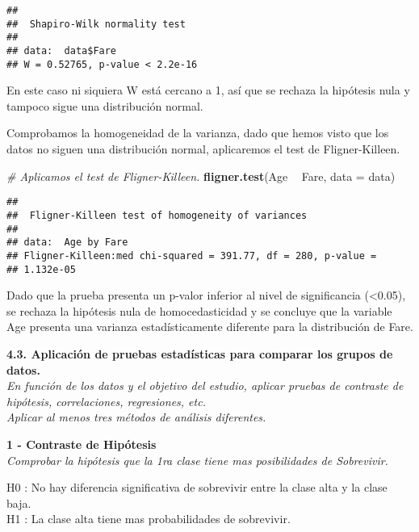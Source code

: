 \documentclass[]{article}
\newenvironment{Shaded}{\begin{snugshade}}{\end{snugshade}}
\newcommand{\KeywordTok}[1]{\textcolor[rgb]{0.13,0.29,0.53}{\textbf{#1}}}
\newcommand{\DataTypeTok}[1]{\textcolor[rgb]{0.13,0.29,0.53}{#1}}
\newcommand{\StringTok}[1]{\textcolor[rgb]{0.31,0.60,0.02}{#1}}
\newcommand{\CommentTok}[1]{\textcolor[rgb]{0.56,0.35,0.01}{\textit{#1}}}
\newcommand{\OperatorTok}[1]{\textcolor[rgb]{0.81,0.36,0.00}{\textbf{#1}}}
\newcommand{\NormalTok}[1]{#1}
\begin{document}
\begin{verbatim}
## 
##  Shapiro-Wilk normality test
## 
## data:  data$Fare
## W = 0.52765, p-value < 2.2e-16
\end{verbatim}

En este caso ni siquiera W está cercano a 1, así que se rechaza la
hipótesis nula y tampoco sigue una distribución normal.

Comprobamos la homogeneidad de la varianza, dado que hemos visto que los
datos no siguen una distribución normal, aplicaremos el test de
Fligner-Killeen.

\begin{Shaded}
\begin{Highlighting}[]
\CommentTok{# Aplicamos el test de Fligner-Killeen.}
\KeywordTok{fligner.test}\NormalTok{(Age }\OperatorTok{~}\StringTok{ }\NormalTok{Fare, }\DataTypeTok{data =}\NormalTok{ data)}
\end{Highlighting}
\end{Shaded}

\begin{verbatim}
## 
##  Fligner-Killeen test of homogeneity of variances
## 
## data:  Age by Fare
## Fligner-Killeen:med chi-squared = 391.77, df = 280, p-value =
## 1.132e-05
\end{verbatim}

Dado que la prueba presenta un p-valor inferior al nivel de
significancia (\textless{}0.05), se rechaza la hipótesis nula de
homocedasticidad y se concluye que la variable Age presenta una varianza
estadísticamente diferente para la distribución de Fare.

\textbf{4.3. Aplicación de pruebas estadísticas para comparar los grupos
de datos.}\\
\emph{En función de los datos y el objetivo del estudio, aplicar pruebas
de contraste de hipótesis, correlaciones, regresiones, etc.}\\
\emph{Aplicar al menos tres métodos de análisis diferentes.}

\textbf{1 - Contraste de Hipótesis}\\
\emph{Comprobar la hipótesis que la 1ra clase tiene mas posibilidades de
Sobrevivir.}

H0 : No hay diferencia significativa de sobrevivir entre la clase alta y
la clase baja.\\
H1 : La clase alta tiene mas probabilidades de sobrevivir.
\end{document}
